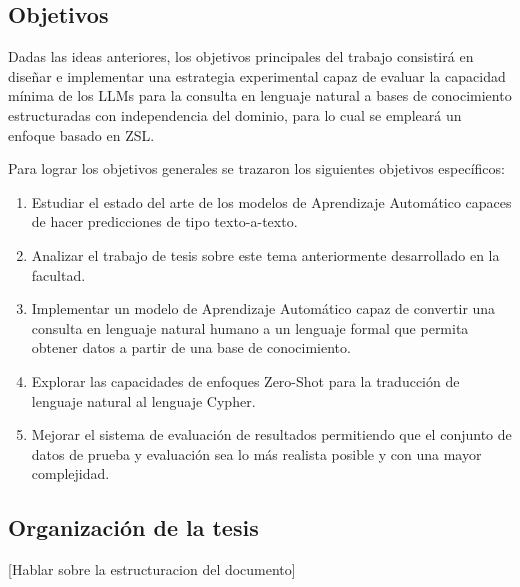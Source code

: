 \subsection*{Objetivos}
Dadas las ideas anteriores, los objetivos principales del trabajo consistirá en diseñar e implementar una estrategia experimental capaz de evaluar la capacidad mínima de los LLMs para la consulta en lenguaje natural a bases de conocimiento estructuradas con independencia del dominio, para lo cual se empleará un enfoque basado en ZSL.

Para lograr los objetivos generales se trazaron los siguientes objetivos específicos:

\begin{enumerate}
	\item Estudiar el estado del arte de los modelos de Aprendizaje Automático capaces de hacer predicciones de tipo texto-a-texto.
	\item Analizar el trabajo de tesis sobre este tema anteriormente desarrollado en la facultad.
	\item Implementar un modelo de Aprendizaje Automático capaz de convertir una consulta en lenguaje natural humano a un lenguaje formal que permita obtener datos a partir de una 		base de conocimiento.
	\item Explorar las capacidades de enfoques Zero-Shot para la traducción de lenguaje natural al lenguaje Cypher.
	\item Mejorar el sistema de evaluación de resultados permitiendo que el conjunto de datos de prueba y evaluación sea lo más realista posible y con una mayor complejidad.
\end{enumerate}

\subsection*{Organización de la tesis}

[Hablar sobre la estructuracion del documento]



